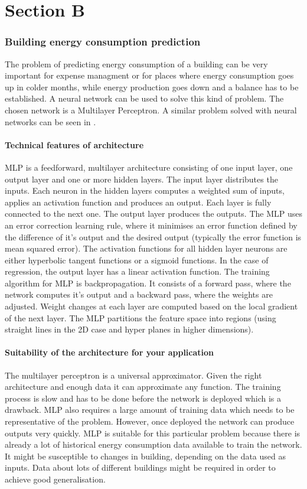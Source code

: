 \documentclass[a4paper, 11pt]{article}
\begin{document}
\part*{Section B}


\section{Building energy consumption prediction}
The problem of predicting energy consumption of a building can be very important for expense managment or for places where energy consumption goes up in colder months, while energy production goes down and a balance has to be established. A neural network can be used to solve this kind of problem. The chosen network is a Multilayer Perceptron. A similar problem solved with neural networks can be seen in \cite{khosravani2016comparison}.
\subsection{Technical features of architecture}
MLP is a feedforward, multilayer architecture consisting of one input layer, one output layer and one or more hidden layers. The input layer distributes the inputs. Each neuron in the hidden layers computes a weighted sum of inputs, applies an activation function and produces an output. Each layer is fully connected to the next one. The output layer produces the outputs. The MLP uses an error correction learning rule, where it minimises an error function defined by the difference of it's output and the desired output (typically the error function is mean squared error). The activation functions for all hidden layer neurons are either hyperbolic tangent functions or a sigmoid functions. In the case of regression, the output layer has a linear activation function. The training algorithm for MLP is backpropagation. It consists of a forward pass, where the network computes it's output and a backward pass, where the weights are adjusted. Weight changes at each layer are computed based on the local gradient of the next layer. The MLP partitions the feature space into regions (using straight lines in the 2D case and hyper planes in higher dimensions). 
\subsection{Suitability of the architecture for your application}
The multilayer perceptron is a universal approximator. Given the right architecture and enough data it can approximate any function. The training process is slow and has to be done before the network is deployed which is a drawback. MLP also requires a large amount of training data which needs to be representative of the problem. However, once deployed the network can produce outputs very quickly. MLP is suitable for this particular problem because there is already a lot of historical energy consumption data available to train the network. It might be susceptible to changes in building, depending on the data used as inputs. Data about lots of different buildings might be required in order to achieve good generalisation.
\end{document}
